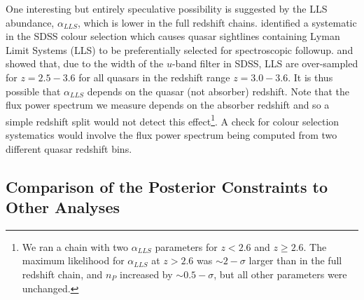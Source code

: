 One interesting but entirely speculative possibility is suggested by the LLS abundance, $\alpha_{LLS}$, which is lower in the full redshift chains. \cite{Prochaska:2009a} identified a systematic in the SDSS colour selection which causes quasar sightlines containing Lyman Limit Systems (LLS) to
be preferentially selected for spectroscopic followup. \cite{Worseck:2011} and \cite{Fumagalli:2013} showed that, due to the width of the $u$-band filter in SDSS,  LLS are over-sampled for $z=2.5-3.6$ for all quasars in the redshift range $z=3.0-3.6$. It is thus possible that $\alpha_{LLS}$ depends on the quasar (not absorber) redshift. Note that the flux power spectrum we measure depends on the absorber redshift and so a simple redshift split would not detect this effect\footnote{We ran a chain with two $\alpha_{LLS}$ parameters for $z < 2.6$ and $z \geq 2.6$. The maximum likelihood for $\alpha_{LLS}$ at $z > 2.6$ was $\sim 2-\sigma$ larger than in the full redshift chain, and $n_P$ increased by $\sim 0.5-\sigma$, but all other parameters were unchanged.}. A check for colour selection systematics would involve the flux power spectrum being computed from two different quasar redshift bins.


\subsection{Comparison of the Posterior Constraints to Other Analyses}
\label{sec:comparison}



